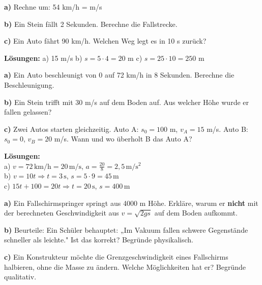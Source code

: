 \documentclass[11pt,a4paper]{article}
\begin{document}
\vspace{0.5cm}

\begin{aufgabe}
\textbf{a)} Rechne um: 54 km/h = \underline{\hspace{2cm}} m/s

\textbf{b)} Ein Stein fällt 2 Sekunden. Berechne die Fallstrecke.

\textbf{c)} Ein Auto fährt 90 km/h. Welchen Weg legt es in 10 s zurück?
\end{aufgabe}

\textbf{Lösungen:} a) 15 m/s \quad b) $s = 5 \cdot 4 = 20$ m \quad c) $s = 25 \cdot 10 = 250$ m

\vspace{0.5cm}

\begin{aufgabe}
\textbf{a)} Ein Auto beschleunigt von 0 auf 72 km/h in 8 Sekunden. Berechne die Beschleunigung.

\textbf{b)} Ein Stein trifft mit 30 m/s auf dem Boden auf. Aus welcher Höhe wurde er fallen gelassen?

\textbf{c)} Zwei Autos starten gleichzeitig. Auto A: $s_0 = 100$ m, $v_A = 15$ m/s. Auto B: $s_0 = 0$, $v_B = 20$ m/s. Wann und wo überholt B das Auto A?
\end{aufgabe}

\textbf{Lösungen:}\\
a) $v = 72\,\mathrm{km/h} = 20\,\mathrm{m/s}$, $a = \frac{20}{8} = 2{,}5\,\mathrm{m/s^2}$\\
b) $v = 10t \Rightarrow t = 3\,\mathrm{s}$, $s = 5 \cdot 9 = 45\,\mathrm{m}$\\
c) $15t + 100 = 20t \Rightarrow t = 20\,\mathrm{s}$, $s = 400\,\mathrm{m}$

\vspace{0.5cm}

\begin{aufgabe}
\textbf{a)} Ein Fallschirmspringer springt aus 4000 m Höhe. Erkläre, warum er \textbf{nicht} mit der berechneten Geschwindigkeit aus $v = \sqrt{2gs}$ auf dem Boden aufkommt.

\textbf{b)} Beurteile: Ein Schüler behauptet: „Im Vakuum fallen schwere Gegenstände schneller als leichte." Ist das korrekt? Begründe physikalisch.

\textbf{c)} Ein Konstrukteur möchte die Grenzgeschwindigkeit eines Fallschirms halbieren, ohne die Masse zu ändern. Welche Möglichkeiten hat er? Begründe qualitativ.
\end{aufgabe}
\end{document}
